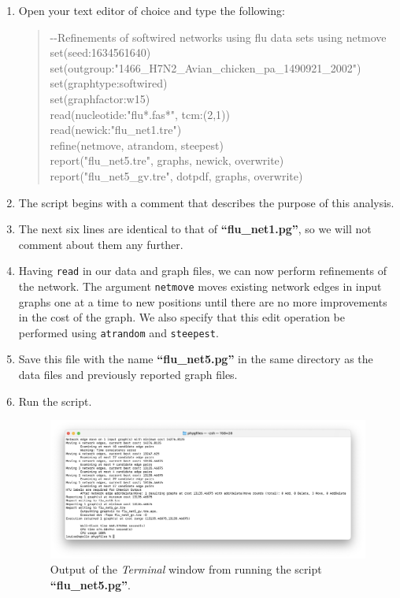 \documentclass[11pt]{article}
\begin{document}
\begin {enumerate}

\item Open your text editor of choice and type the following:

	\begin{quote}	
	-\/-Refinements of softwired networks using flu data sets using netmove\\
	set(seed:1634561640)\\
	set(outgroup:"1466\_H7N2\_Avian\_chicken\_pa\_1490921\_2002")\\
	set(graphtype:softwired)\\
	set(graphfactor:w15)\\ 
	read(nucleotide:"flu*.fas*", tcm:(2,1))\\
	read(newick:"flu\_net1.tre")\\
	refine(netmove, atrandom, steepest)\\
	report("flu\_net5.tre", graphs, newick, overwrite)\\
	report("flu\_net5\_gv.tre", dotpdf, graphs, overwrite)
	\end{quote}

\item The script begins with a comment that describes the purpose of this 
analysis.

\item The next six lines are identical to that of \textbf{``flu\_net1.pg''}, so we 
will not comment about them any further. 

\item Having \texttt{read} in our data and graph files, we can now perform 
refinements of the network. The argument \texttt{netmove} moves existing 
network edges in input graphs one at a time to new positions until there
are no more improvements in the cost of the graph. We also specify that 
this edit operation be performed using \texttt{atrandom} and \texttt{steepest}.

\item Save this file with the name \textbf{``flu\_net5.pg''} in the same directory 
as the data files and previously reported graph files.

\item Run the script.

\begin{figure}[H]
\centering
\includegraphics[width=\textwidth]{output4.png}
\caption{Output of the \textit{Terminal} window from running the script 
\textbf{``flu\_net5.pg''}.}
\label{output4}
\end{figure}


\end{enumerate}
\end{document}
